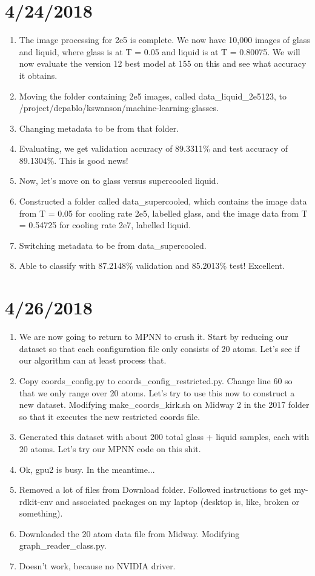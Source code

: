 \documentclass[12pt,reqno]{amsart}
\numberwithin{equation}{section}
\begin{document}
\section{4/24/2018}

\begin{enumerate}
\item The image processing for 2e5 is complete.  We now have 10,000 images of glass and liquid, where glass is at T = 0.05 and liquid is at T = 0.80075.  We will now evaluate the version 12 best model at 155 on this and see what accuracy it obtains.  
\item Moving the folder containing 2e5 images, called data\_liquid\_2e5123, to /project/depablo/kswanson/machine-learning-glasses.  
\item Changing metadata to be from that folder.  
\item Evaluating, we get validation accuracy of 89.3311\% and test accuracy of 89.1304\%.  This is good news!
\item Now, let's move on to glass versus supercooled liquid.
\item Constructed a folder called data\_supercooled, which contains the image data from T = 0.05 for cooling rate 2e5, labelled glass, and the image data from T = 0.54725 for cooling rate 2e7, labelled liquid.  
\item Switching metadata to be from data\_supercooled.  
\item Able to classify with 87.2148\% validation and 85.2013\% test! Excellent.  
\end{enumerate}

\section{4/26/2018}

\begin{enumerate}
\item We are now going to return to MPNN to crush it.  Start by reducing our dataset so that each configuration file only consists of 20 atoms.  Let's see if our algorithm can at least process that.
\item Copy coords\_config.py to coords\_config\_restricted.py.  Change line 60 so that we only range over 20 atoms.  Let's try to use this now to construct a new dataset.  Modifying make\_coords\_kirk.sh on Midway 2 in the 2017 folder so that it executes the new restricted coords file.  
\item Generated this dataset with about 200 total glass + liquid samples, each with 20 atoms.  Let's try our MPNN code on this shit.  
\item Ok, gpu2 is busy.  In the meantime...
\item Removed a lot of files from Download folder.  Followed instructions to get my-rdkit-env and associated packages on my laptop (desktop is, like, broken or something).  
\item Downloaded the 20 atom data file from Midway.  Modifying graph\_reader\_class.py.
\item Doesn't work, because no NVIDIA driver.   
\end{enumerate}
\end{document}

